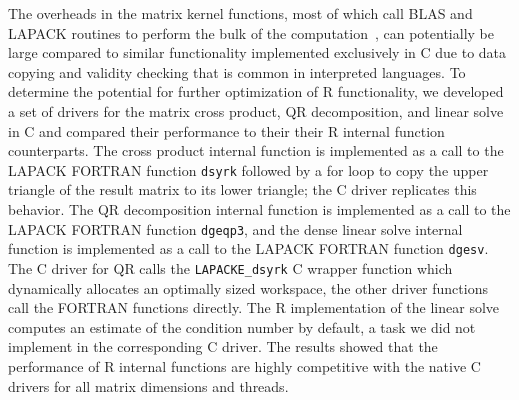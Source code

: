 The overheads in the matrix kernel functions, most of which call BLAS and
  LAPACK routines to perform the bulk of the computation~\cite{cran:Rmanuals},
  can potentially be large compared to similar functionality implemented
  exclusively in C due to data copying and validity checking that is common in
  interpreted languages.
To determine the potential for further optimization of R functionality, we
  developed a set of drivers for the matrix cross product, QR decomposition,
  and linear solve in C and compared their performance to their
  their R internal function counterparts.
The cross product internal function is implemented as a call to the LAPACK
  FORTRAN function \texttt{dsyrk} followed by a for loop to copy the upper
  triangle of the result matrix to its lower triangle; the C driver replicates
  this behavior.
The QR decomposition internal function is implemented as a call to the LAPACK
  FORTRAN function \texttt{dgeqp3}, and the dense linear solve internal function
  is implemented as a call to the LAPACK FORTRAN function \texttt{dgesv}.
The C driver for QR calls the \texttt{LAPACKE\_dsyrk} C wrapper function which
  dynamically allocates an optimally sized workspace, the other driver functions
  call the FORTRAN functions directly.
The R implementation of the linear solve computes an estimate of the
  condition number by default, a task we did not implement in the corresponding
  C driver.
The results showed that the performance of R internal functions are highly competitive
  with the native C drivers for all matrix dimensions and threads.

